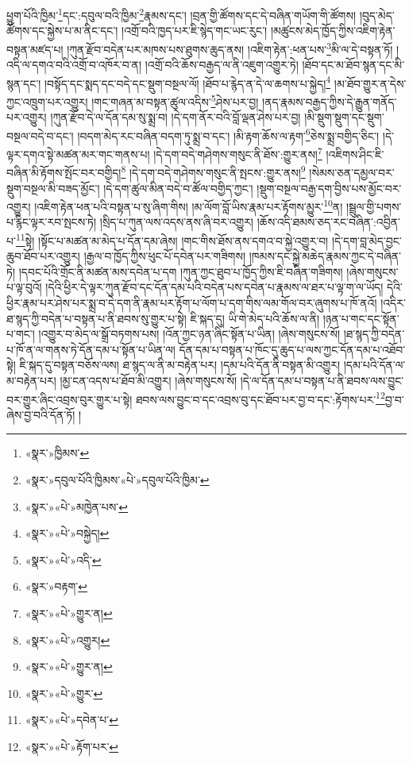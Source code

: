 ཕྱུག་པོའི་ཁྱིམ་\footnote{«སྣར་»ཁྱིམས་}དང་:དབུལ་བའི་ཁྱིམ་\footnote{«སྣར་»དབུལ་པོའི་ཁྱིམས་«པེ་»དབུལ་པོའི་ཁྱིམ་}རྣམས་དང་། །བྲན་གྱི་ཚོགས་དང་དེ་བཞིན་གཡོག་གི་ཚོགས། །བུད་མེད་ཚོགས་དང་སྐྱེས་པ་མ་ནིང་དང་། །འགྲོ་བའི་ཁྱད་པར་ཇི་སྙེད་གང་ཡང་རུང་། །མཚུངས་མེད་ཁྱོད་ཀྱིས་འཇིག་རྟེན་བསྟན་མཛད་པ། །ཀུན་རྫོབ་བདེན་པར་མཁས་པས་ཐུགས་ཆུད་ནས། །འཇིག་རྟེན་:ཕན་པས་\footnote{«སྣར་»«པེ་»མཁྱེན་པས་}མི་ལ་དེ་བསྟན་ཏོ། །འདི་ལ་དགའ་བའི་འགྲོ་བ་འཁོར་བ་ན། །འགྲོ་བའི་ཆོས་བརྒྱད་ལ་ནི་འཇུག་འགྱུར་ཏེ། །ཐོབ་དང་མ་ཐོབ་སྙན་དང་མི་སྙན་དང་། །བསྟོད་དང་སྨད་དང་བདེ་དང་སྡུག་བསྔལ་ལོ། །ཐོབ་པ་རྙེད་ན་དེ་ལ་ཆགས་པ་སྐྱེད།\footnote{«སྣར་»«པེ་»བསྐྱེད།} །མ་ཐོབ་གྱུར་ན་དེས་ཀྱང་འཁྲུག་པར་འགྱུར། །གང་གཞན་མ་བསྟན་ཚུལ་འདིས་\footnote{«སྣར་»«པེ་»འདི་}ཤེས་པར་བྱ། །ནད་རྣམས་བརྒྱད་ཀྱིས་དེ་རྒྱུན་གནོད་པར་འགྱུར། །ཀུན་རྫོབ་དེ་ལ་དོན་དམ་སུ་སྨྲ་བ། །དེ་དག་ནོར་བའི་བློ་ལྡན་ཤེས་པར་བྱ། །མི་སྡུག་སྡུག་དང་སྡུག་བསྔལ་བདེ་བ་དང་། །བདག་མེད་རང་བཞིན་བདག་ཏུ་སྨྲ་བ་དང་། །མི་རྟག་ཆོས་ལ་རྟག་\footnote{«སྣར་»བརྟག་}ཅེས་སྨྲ་བགྱིད་ཅིང་། །དེ་ལྟར་དགའ་སྟེ་མཚན་མར་གང་གནས་པ། །དེ་དག་བདེ་གཤེགས་གསུང་ནི་ཐོས་:གྱུར་ནས།\footnote{«སྣར་»«པེ་»གྱུར་ན།} །འཇིགས་ཤིང་ཇི་བཞིན་མི་རྟོགས་སྤོང་བར་བགྱིད།\footnote{«སྣར་»«པེ་»འགྱུར།} །དེ་དག་བདེ་གཤེགས་གསུང་ནི་སྤངས་:གྱུར་ནས།\footnote{«སྣར་»«པེ་»གྱུར་ན།} །སེམས་ཅན་དམྱལ་བར་སྡུག་བསྔལ་མི་བཟད་མྱོང་། །དེ་དག་ཚུལ་མིན་བདེ་བ་ཚོལ་བགྱིད་ཀྱང་། །སྡུག་བསྔལ་བརྒྱ་དག་བྱིས་པས་མྱོང་བར་འགྱུར། །འཇིག་རྟེན་ཕན་པའི་བསྟན་པ་སུ་ཞིག་གིས། །མ་ལོག་བློ་ཡིས་རྣམ་པར་རྟོགས་མྱུར་\footnote{«སྣར་»«པེ་»གྱུར་}ན། །སྦྲུལ་གྱི་པགས་པ་རྙིང་ལྟར་རབ་སྤངས་ཏེ། །སྲིད་པ་ཀུན་ལས་འདས་ནས་ཞི་བར་འགྱུར། །ཆོས་འདི་ཐམས་ཅད་རང་བཞིན་:འབྱིན་པ་\footnote{«སྣར་»«པེ་»དབེན་པ་}སྟེ། །སྟོང་པ་མཚན་མ་མེད་པ་དོན་དམ་ཞེས། །གང་གིས་ཐོས་ནས་དགའ་བ་སྐྱེ་འགྱུར་བ། །དེ་དག་བླ་མེད་བྱང་ཆུབ་ཐོབ་པར་འགྱུར། །རྒྱལ་བ་ཁྱོད་ཀྱིས་ཕུང་པོ་དབེན་པར་གཟིགས། །ཁམས་དང་སྐྱེ་མཆེད་རྣམས་ཀྱང་དེ་བཞིན་ཏེ། །དབང་པོའི་གྲོང་ནི་མཚན་མས་དབེན་པ་དག །ཀུན་ཀྱང་ཐུབ་པ་ཁྱོད་ཀྱིས་ཇི་བཞིན་གཟིགས། །ཞེས་གསུངས་པ་ལྟ་བུའོ། །དེའི་ཕྱིར་དེ་ལྟར་ཀུན་རྫོབ་དང་དོན་དམ་པའི་བདེན་པས་དབེན་པ་རྣམས་ལ་ཐར་པ་ལྟ་ག་ལ་ཡོད། དེའི་ཕྱིར་རྣམ་པར་ཤེས་པར་སྨྲ་བ་དེ་དག་ནི་རྣམ་པར་རྟོག་པ་ལོག་པ་དག་གིས་ལམ་གོལ་བར་ཞུགས་པ་ཁོ་ནའོ། །འདིར་ཐ་སྙད་ཀྱི་བདེན་པ་བསྟན་པ་ནི་ཐབས་སུ་གྱུར་པ་སྟེ། ཇི་སྐད་དུ། ཡི་གེ་མེད་པའི་ཆོས་ལ་ནི། །ཉན་པ་གང་དང་སྟོན་པ་གང་། །འགྱུར་བ་མེད་ལ་སྒྲོ་བཏགས་པས། །འོན་ཀྱང་ཉན་ཞིང་སྟོན་པ་ཡིན། །ཞེས་གསུངས་སོ། །ཐ་སྙད་ཀྱི་བདེན་པ་ཁོ་ན་ལ་གནས་ཏེ་དོན་དམ་པ་སྟོན་པ་ཡིན་ལ། དོན་དམ་པ་བསྟན་པ་ཁོང་དུ་ཆུད་པ་ལས་ཀྱང་དོན་དམ་པ་འཐོབ་སྟེ། ཇི་སྐད་དུ་བསྟན་བཅོས་ལས། ཐ་སྙད་ལ་ནི་མ་བརྟེན་པར། །དམ་པའི་དོན་ནི་བསྟན་མི་འགྱུར། །དམ་པའི་དོན་ལ་མ་བརྟེན་པར། །མྱ་ངན་འདས་པ་ཐོབ་མི་འགྱུར། །ཞེས་གསུངས་སོ། །དེ་ལ་དོན་དམ་པ་བསྟན་པ་ནི་ཐབས་ལས་བྱུང་བར་གྱུར་ཞིང་འབྲས་བུར་གྱུར་པ་སྟེ། ཐབས་ལས་བྱུང་བ་དང་འབྲས་བུ་དང་ཐོབ་པར་བྱ་བ་དང་:རྟོགས་པར་\footnote{«སྣར་»«པེ་»རྟོག་པར་}བྱ་བ་ཞེས་བྱ་བའི་དོན་ཏོ། །
